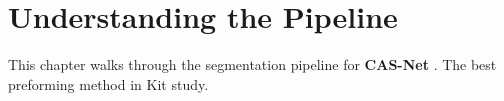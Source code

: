 
\section{Understanding the Pipeline}
\label{ch:pipeline}


This chapter walks through the segmentation pipeline for \textbf{CAS-Net} \cite{dong2023casnet}. The best preforming method in Kit study. 

